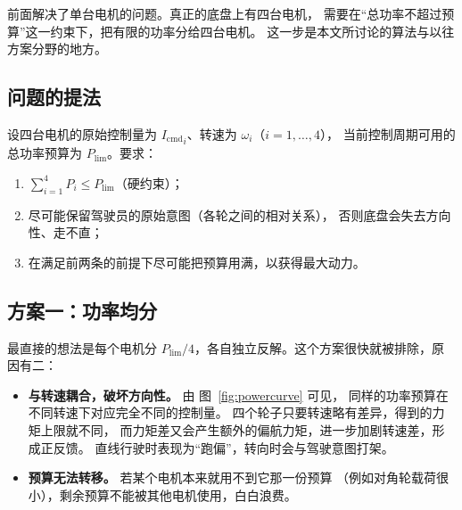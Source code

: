 \documentclass[cn,blue,11pt,device=normal]{elegantnote}
\newcommand{\Icmd}{I_{\mathrm{cmd}}{}}
\newcommand{\Plim}{P_{\mathrm{lim}}{}}
\begin{document}
前面解决了单台电机的问题。真正的底盘上有四台电机，
需要在“总功率不超过预算”这一约束下，把有限的功率分给四台电机。
这一步是本文所讨论的算法与以往方案分野的地方。

\subsection{问题的提法}

设四台电机的原始控制量为 ${\Icmd}_i$、转速为 $\omega_i$（$i=1,\dots,4$），
当前控制周期可用的总功率预算为 $\Plim$。要求：
\begin{enumerate}
  \item $\sum_{i=1}^{4} P_i \le \Plim$（硬约束）；
  \item 尽可能保留驾驶员的原始意图（各轮之间的相对关系），
  否则底盘会失去方向性、走不直；
  \item 在满足前两条的前提下尽可能把预算用满，以获得最大动力。
\end{enumerate}

\subsection{方案一：功率均分}

最直接的想法是每个电机分 $\Plim/4$，各自独立反解。这个方案很快就被排除，原因有二：

\begin{itemize}
  \item \textbf{与转速耦合，破坏方向性。} 由 图~\ref{fig:powercurve} 可见，
  同样的功率预算在不同转速下对应完全不同的控制量。
  四个轮子只要转速略有差异，得到的力矩上限就不同，
  而力矩差又会产生额外的偏航力矩，进一步加剧转速差，形成正反馈。
  直线行驶时表现为“跑偏”，转向时会与驾驶意图打架。
  \item \textbf{预算无法转移。} 若某个电机本来就用不到它那一份预算
  （例如对角轮载荷很小），剩余预算不能被其他电机使用，白白浪费。
\end{itemize}
\end{document}
